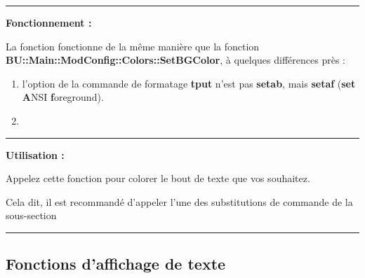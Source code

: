 \documentclass[a4paper,10pt]{article}
\begin{document}

\par\noindent\rule{\textwidth}{0.4pt}

\begin{justify}
    \textbf{Fonctionnement :}

    La fonction fonctionne de la même manière que la fonction \textbf{\color{func}BU::Main::ModConfig::Colors::SetBGColor}, à quelques différences près :
    \begin{enumerate}
        \item l'option de la commande de formatage \textbf{\color{cmds}tput} n'est pas \textbf{setab}, mais \textbf{setaf} (\textbf{set} \textbf{A}NSI \textbf{f}oreground).
        \item
    \end{enumerate}
\end{justify}



\par\noindent\rule{\textwidth}{0.4pt}

\begin{justify}
    \textbf{Utilisation :}

    Appelez cette fonction pour colorer le bout de texte que vos souhaitez.
\end{justify}

\begin{justify}
    Cela dit, il est recommandé d'appeler l'une des substitutions de commande de la sous-section \textbf{\color{sec2}}
\end{justify}







\color{sec2}\par\noindent\rule{\textwidth}{0.4pt}\color{text}

\color{sec2}
\subsection{Fonctions d'affichage de texte}\color{text}




\end{document}

